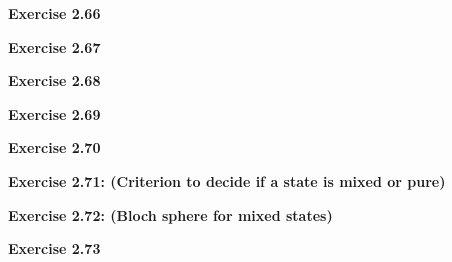 \documentclass{article}
\begin{document}
\bigskip

\begin{framed}
    \noindent \textbf{Exercise 2.66}
    
    \medskip
    
    
\end{framed}

\bigskip

\begin{framed}
    \noindent \textbf{Exercise 2.67}
    
    \medskip
    
    
\end{framed}

\bigskip

\begin{framed}
    \noindent \textbf{Exercise 2.68}
    
    \medskip
    
    
\end{framed}

\bigskip

\begin{framed}
    \noindent \textbf{Exercise 2.69}
    
    \medskip
    
    
\end{framed}

\bigskip

\begin{framed}
    \noindent \textbf{Exercise 2.70}
    
    \medskip
    
    
\end{framed}

\bigskip

\begin{framed}
    \noindent \textbf{Exercise 2.71: (Criterion to decide if a state is mixed or pure)}
    
    \medskip
    
    
\end{framed}

\bigskip

\begin{framed}
    \noindent \textbf{Exercise 2.72: (Bloch sphere for mixed states)}
    
    \medskip
    
    
\end{framed}

\bigskip

\begin{framed}
    \noindent \textbf{Exercise 2.73}
    
    \medskip
    
    
\end{framed}
\end{document}
